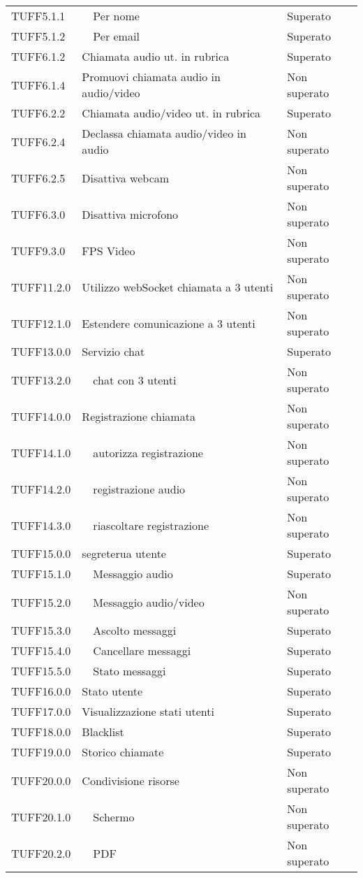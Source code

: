 \begin{longtable}{lp{}l}
TUFF5.1.1&	\ \ Per nome	&Superato\\
TUFF5.1.2&	\ \ Per email	&Superato\\
TUFF6.1.2&	Chiamata audio ut. in rubrica	&Superato\\
TUFF6.1.4&	Promuovi chiamata audio in audio/video	&Non superato\\
TUFF6.2.2&	Chiamata audio/video ut. in rubrica &Superato\\
TUFF6.2.4&	Declassa chiamata audio/video in audio	&Non superato\\
TUFF6.2.5&	Disattiva webcam &Non superato\\
TUFF6.3.0&	Disattiva microfono	&Non superato\\
TUFF9.3.0&	FPS Video		&Non superato\\
TUFF11.2.0&	Utilizzo webSocket chiamata a 3 utenti 	&Non superato\\
TUFF12.1.0&	Estendere comunicazione a 3 utenti	&Non superato\\
TUFF13.0.0&	Servizio chat		&Superato\\
TUFF13.2.0&	\ \ chat con 3 utenti	&Non superato\\
TUFF14.0.0&	Registrazione chiamata		&Non superato\\
TUFF14.1.0&	\ \ autorizza registrazione &Non superato\\
TUFF14.2.0&	\ \ registrazione audio		&Non superato\\
TUFF14.3.0&	\ \ riascoltare registrazione &Non superato\\
TUFF15.0.0&	segreterua utente		&Superato\\
TUFF15.1.0&	\ \ Messaggio audio	&Superato\\
TUFF15.2.0&	\ \ Messaggio audio/video		&Non superato\\
TUFF15.3.0&	\ \ Ascolto messaggi &Superato\\
TUFF15.4.0&	\ \ Cancellare messaggi	&Superato\\
TUFF15.5.0&	\ \ Stato messaggi 	&Superato\\
TUFF16.0.0&	Stato utente	&Superato\\
TUFF17.0.0&	Visualizzazione stati utenti	&Superato\\
TUFF18.0.0&	Blacklist		&Superato\\
TUFF19.0.0&	Storico chiamate	 &Superato\\
TUFF20.0.0&	Condivisione risorse	&Non superato\\
TUFF20.1.0&	\ \ Schermo		&Non superato\\
TUFF20.2.0&	\ \ PDF	&Non superato\\

\end{longtable}

